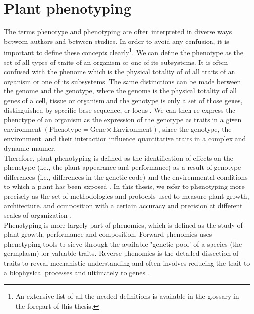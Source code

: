 \section{Plant phenotyping}
The terms phenotype and phenotyping are often interpreted in diverse ways between authors and between studies. In order to avoid any confusion, it is important to define these concepts clearly\footnote{An extensive list of all the needed definitions is available in the glossary in the forepart of this thesis.}.
We can define the phenotype as the set of all types of traits of an organism or one of its subsystems. It is often confused with the phenome which is the physical totality of of all traits of an organism or one of its subsystems. The same distinctions can be made between the genome and the genotype, where the genome is the physical totality of all genes of a cell, tissue or organism and the genotype is only a set of those genes, distinguished by specific base sequence, or locus \parencite{mahner1997exactly}. We can then re-express the phenotype of an organism as the expression of the genotype as traits in a given environment $(\mathrm{Phenotype} = \mathrm{Gene} \times \mathrm{Environment})$, since the genotype, the environment, and their interaction influence quantitative traits in a complex and dynamic manner.\\
Therefore, plant phenotyping is defined as the identification of effects on the phenotype (i.e., the plant appearance and performance) as a result of genotype differences (i.e., differences in the genetic code) and the environmental conditions to which a plant has been exposed \parencite{houle_phenomics:_2010,fiorani_future_2013}. In this thesis, we refer to phenotyping more precisely as the set of methodologies and protocols used to measure plant growth, architecture, and composition with a certain accuracy and precision at different scales of organization \parencite{fiorani_future_2013}.\\
Phenotyping is more largely part of phenomics, which is defined as the study of plant growth, performance and composition. Forward phenomics uses phenotyping tools to sieve through the available "genetic pool" of a species (the germplasm) for valuable traits. Reverse phenomics is the detailed dissection of traits to reveal mechanistic understanding and often involves reducing the trait to a biophysical processes and ultimately to genes  \parencite{furbank_phenomics_2011}.\\


